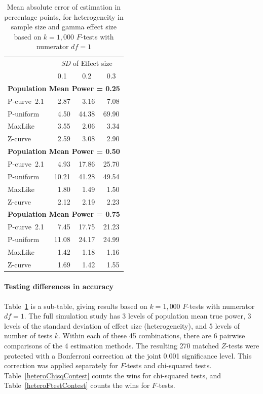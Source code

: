 \documentclass[jou]{apa6} %
\begin{document}
\begin{table}[h]
\caption{Mean absolute error of estimation in percentage points, for heterogeneity in sample size and gamma effect size based on $k=1,000$ $F$-tests with numerator $df=1$}
{\small
\begin{center}
\begin{tabular}{lccc}  \hline
      & \multicolumn{3}{c}{\emph{SD} of Effect size} \\
           &  0.1   &  0.2    & 0.3  \\ \hline
\multicolumn{4}{l}{\textbf{Population Mean Power = 0.25}} \\ \hline
P-curve~2.1    & ~2.87  & ~3.16  & ~7.08   \\
P-uniform  & ~4.50  & 44.38  & 69.90   \\
MaxLike    & ~3.55  & ~2.06  & ~3.34   \\
Z-curve    & ~2.59  & ~3.08  & ~2.90   \\ \hline
\multicolumn{4}{l}{\textbf{Population Mean Power = 0.50}} \\ \hline
P-curve~2.1    & ~4.93  & 17.86 & 25.70   \\
P-uniform  & 10.21  & 41.28 & 49.54   \\
MaxLike    & ~1.80  & ~1.49 & ~1.50   \\
Z-curve    & ~2.12  & ~2.19 & ~2.23   \\ \hline
\multicolumn{4}{l}{\textbf{Population Mean Power = 0.75}} \\ \hline
P-curve~2.1    & ~7.45  & 17.75 & 21.23   \\
P-uniform  & 11.08  & 24.17 & 24.99   \\
MaxLike    & ~1.42  & ~1.18 & ~1.16   \\
Z-curve    & ~1.69  & ~1.42 & ~1.55   \\ \hline
\end{tabular}
\end{center}
} %
\label{heteroabserr}  %
\end{table}

\paragraph{Testing differences in accuracy} Table~\ref{heteroabserr} is a sub-table, giving results based on $k=1,000$ $F$-tests with numerator $df=1$. The full simulation study has 3 levels of population mean true power, 3 levels of the standard deviation of effect size (heterogeneity), and 5 levels of number of tests $k$. Within each of these 45 combinations, there are 6 pairwise comparisons of the 4 estimation methods. The resulting 270 matched $Z$-tests were protected with a Bonferroni correction at the joint 0.001 significance level. This correction was applied separately for $F$-tests and chi-squared tests. Table~\ref{heteroChisqContest} counts the wins for chi-squared tests, and Table~\ref{heteroFtestContest} counts the wins for $F$-tests. 
\end{document}
